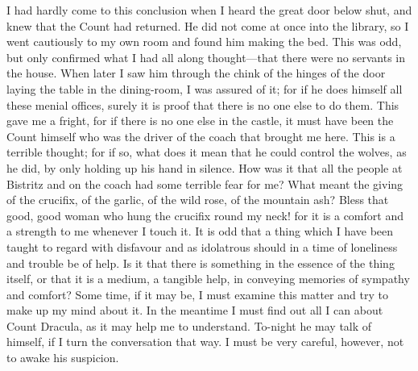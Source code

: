 I had hardly come to this conclusion when I heard the great door below shut, and knew that the Count had returned. He did not come at once into the library, so I went cautiously to my own room and found him making the bed. This was odd, but only confirmed what I had all along thought—that there were no servants in the house. When later I saw him through the chink of the hinges of the door laying the table in the dining-room, I was assured of it; for if he does himself all these menial offices, surely it is proof that there is no one else to do them. This gave me a fright, for if there is no one else in the castle, it must have been the Count himself who was the driver of the coach that brought me here. This is a terrible thought; for if so, what does it mean that he could control the wolves, as he did, by only holding up his hand in silence. How was it that all the people at Bistritz and on the coach had some terrible fear for me? What meant the giving of the crucifix, of the garlic, of the wild rose, of the mountain ash? Bless that good, good woman who hung the crucifix round my neck! for it is a comfort and a strength to me whenever I touch it. It is odd that a thing which I have been taught to regard with disfavour and as idolatrous should in a time of loneliness and trouble be of help. Is it that there is something in the essence of the thing itself, or that it is a medium, a tangible help, in conveying memories of sympathy and comfort? Some time, if it may be, I must examine this matter and try to make up my mind about it. In the meantime I must find out all I can about Count Dracula, as it may help me to understand. To-night he may talk of himself, if I turn the conversation that way. I must be very careful, however, not to awake his suspicion.


